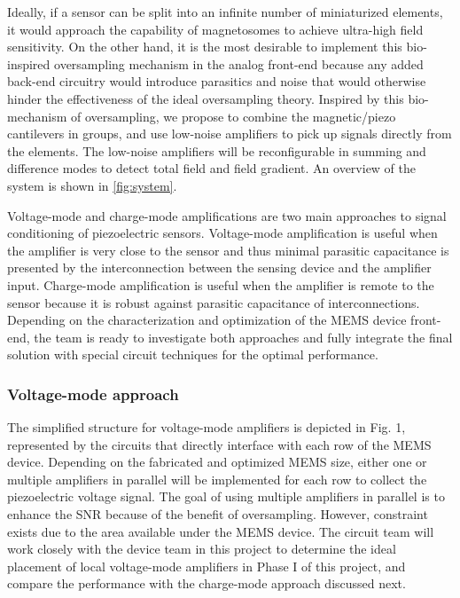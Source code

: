 Ideally, if a sensor can be split into an infinite number of miniaturized elements, it would approach the capability of magnetosomes to achieve ultra-high field sensitivity. On the other hand, it is the most desirable to implement this bio-inspired oversampling mechanism in the analog front-end because any added back-end circuitry would introduce parasitics and noise that would otherwise hinder the effectiveness of the ideal oversampling theory. Inspired by this bio-mechanism of oversampling, we propose to combine the magnetic/piezo cantilevers in groups, and use low-noise amplifiers to pick up signals directly from the elements. The low-noise amplifiers will be reconfigurable in summing and difference modes to detect total field and field gradient. An overview of the system is shown in \ref{fig:system}.

Voltage-mode and charge-mode amplifications are two main approaches to signal conditioning of piezoelectric sensors. Voltage-mode amplification is useful when the amplifier is very close to the sensor and thus minimal parasitic capacitance is presented by the interconnection between the sensing device and the amplifier input. Charge-mode amplification is useful when the amplifier is remote to the sensor because it is robust against parasitic capacitance of interconnections. Depending on the characterization and optimization of the MEMS device front-end, the team is ready to investigate both approaches and fully integrate the final solution with special circuit techniques for the optimal performance. 

\subsubsection{Voltage-mode approach}

The simplified structure for voltage-mode amplifiers is depicted in Fig. 1, represented by the circuits that directly interface with each row of the MEMS device. Depending on the fabricated and optimized MEMS size, either one or multiple amplifiers in parallel will be implemented for each row to collect the piezoelectric voltage signal. The goal of using multiple amplifiers in parallel is to enhance the SNR because of the benefit of oversampling. However, constraint exists due to the area available under the MEMS device. The circuit team will work closely with the device team in this project to determine the ideal placement of local voltage-mode amplifiers in Phase I of this project, and compare the performance with the charge-mode approach discussed next.  

